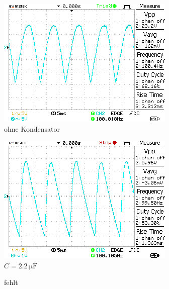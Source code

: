 \begin{figure}[H]
    \centering
    \begin{subfigure}[b]{0.45\textwidth}
        \includegraphics[width=\textwidth]{figs/4/DS0000.png}
        \caption{ohne Kondensator}
        \label{fig:4_C0}
    \end{subfigure}
    \hfill
    \begin{subfigure}[b]{0.45\textwidth}
        \includegraphics[width=\textwidth]{figs/4/DS0001.png}
        \caption{$C=\SI{2,2}{\micro\farad}$}
        \label{fig:4_C1}
    \end{subfigure}
    \vspace{0.5em}
    \begin{subfigure}[b]{0.45\textwidth}
        \centering
        fehlt

\end{subfigure}
\end{figure}

